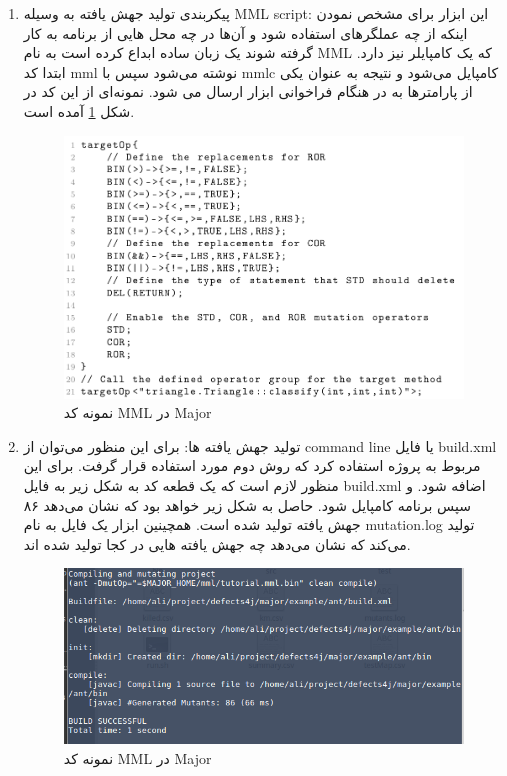 \begin{enumerate}
\item

پیکربندی تولید جهش یافته به وسیله MML script: این ابزار برای مشخص نمودن اینکه از چه عملگرهای استفاده شود و آن‌ها در چه محل هایی از برنامه به کار گرفته شوند یک زبان ساده ابداع کرده است به نام MML که یک کامپایلر نیز دارد. ابتدا کد mml نوشته می‌شود سپس با mmlc کامپایل می‌شود و نتیجه به عنوان یکی از پارامترها به در هنگام فراخوانی ابزار ارسال می شود. نمونه‌ای از این کد در شکل \ref{fig:major-mml} آمده است. 

\begin{figure}[H]
	\centering
	\includegraphics[width=.8\textwidth]{img/case_study/major-mml.png}
	\caption{نمونه کد MML در Major}
	\label{fig:major-mml}
\end{figure}
\item 	
تولید جهش یافته ها: برای این منظور می‌توان از command line یا فایل build.xml مربوط به پروژه استفاده کرد که روش دوم مورد استفاده قرار گرفت. برای این منظور لازم است که یک قطعه کد به شکل زیر به فایل build.xml اضافه شود. و سپس برنامه کامپایل شود. حاصل به شکل زیر خواهد بود که نشان می‌دهد ۸۶ جهش یافته تولید شده است. همچینین ابزار یک فایل به نام mutation.log تولید می‌کند که نشان می‌دهد چه جهش یافته هایی در کجا تولید شده اند. 

\begin{figure}[H]
	\centering
	\includegraphics[width=.8\textwidth]{img/case_study/major-mutant.png}
	\caption{نمونه کد MML در Major}
	\label{fig:major-mutant}
\end{figure}


\end{enumerate}
